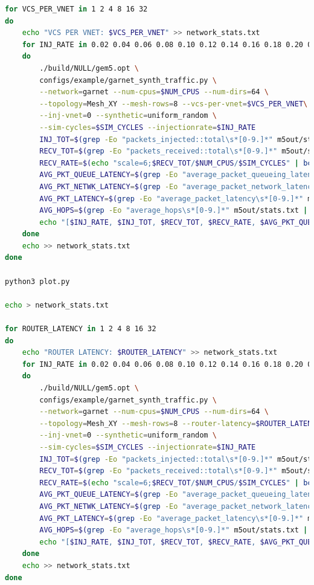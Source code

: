 \documentclass{article}
\begin{document}
\begin{lstlisting}[language=bash]
for VCS_PER_VNET in 1 2 4 8 16 32
do
	echo "VCS PER VNET: $VCS_PER_VNET" >> network_stats.txt
	for INJ_RATE in 0.02 0.04 0.06 0.08 0.10 0.12 0.14 0.16 0.18 0.20 0.22 0.24 0.26 0.28 0.30 0.32 0.34 0.36 0.38 0.40 0.42 0.44 0.46 0.48 0.50 0.52 0.54 0.56 0.58 0.60 0.62 0.64 0.66 0.68 0.70 0.72 0.74 0.76 0.78 0.80
	do
		./build/NULL/gem5.opt \
		configs/example/garnet_synth_traffic.py \
		--network=garnet --num-cpus=$NUM_CPUS --num-dirs=64 \
		--topology=Mesh_XY --mesh-rows=8 --vcs-per-vnet=$VCS_PER_VNET\
		--inj-vnet=0 --synthetic=uniform_random \
		--sim-cycles=$SIM_CYCLES --injectionrate=$INJ_RATE
		INJ_TOT=$(grep -Eo "packets_injected::total\s*[0-9.]*" m5out/stats.txt | grep -Eo "[0-9.]*")
		RECV_TOT=$(grep -Eo "packets_received::total\s*[0-9.]*" m5out/stats.txt | grep -Eo "[0-9.]*")
		RECV_RATE=$(echo "scale=6;$RECV_TOT/$NUM_CPUS/$SIM_CYCLES" | bc)
		AVG_PKT_QUEUE_LATENCY=$(grep -Eo "average_packet_queueing_latency\s*[0-9.]*" m5out/stats.txt | grep -Eo "[0-9.]*")
		AVG_PKT_NETWK_LATENCY=$(grep -Eo "average_packet_network_latency\s*[0-9.]*" m5out/stats.txt | grep -Eo "[0-9.]*")
		AVG_PKT_LATENCY=$(grep -Eo "average_packet_latency\s*[0-9.]*" m5out/stats.txt | grep -Eo "[0-9.]*")
		AVG_HOPS=$(grep -Eo "average_hops\s*[0-9.]*" m5out/stats.txt | grep -Eo "[0-9.]*")
		echo "[$INJ_RATE, $INJ_TOT, $RECV_TOT, $RECV_RATE, $AVG_PKT_QUEUE_LATENCY, $AVG_PKT_NETWK_LATENCY, $AVG_PKT_LATENCY, $AVG_HOPS]" >> network_stats.txt
	done
	echo >> network_stats.txt
done

python3 plot.py

echo > network_stats.txt

for ROUTER_LATENCY in 1 2 4 8 16 32
do
	echo "ROUTER LATENCY: $ROUTER_LATENCY" >> network_stats.txt
	for INJ_RATE in 0.02 0.04 0.06 0.08 0.10 0.12 0.14 0.16 0.18 0.20 0.22 0.24 0.26 0.28 0.30 0.32 0.34 0.36 0.38 0.40 0.42 0.44 0.46 0.48 0.50 0.52 0.54 0.56 0.58 0.60 0.62 0.64 0.66 0.68 0.70 0.72 0.74 0.76 0.78 0.80
	do
		./build/NULL/gem5.opt \
		configs/example/garnet_synth_traffic.py \
		--network=garnet --num-cpus=$NUM_CPUS --num-dirs=64 \
		--topology=Mesh_XY --mesh-rows=8 --router-latency=$ROUTER_LATENCY\
		--inj-vnet=0 --synthetic=uniform_random \
		--sim-cycles=$SIM_CYCLES --injectionrate=$INJ_RATE
		INJ_TOT=$(grep -Eo "packets_injected::total\s*[0-9.]*" m5out/stats.txt | grep -Eo "[0-9.]*")
		RECV_TOT=$(grep -Eo "packets_received::total\s*[0-9.]*" m5out/stats.txt | grep -Eo "[0-9.]*")
		RECV_RATE=$(echo "scale=6;$RECV_TOT/$NUM_CPUS/$SIM_CYCLES" | bc)
		AVG_PKT_QUEUE_LATENCY=$(grep -Eo "average_packet_queueing_latency\s*[0-9.]*" m5out/stats.txt | grep -Eo "[0-9.]*")
		AVG_PKT_NETWK_LATENCY=$(grep -Eo "average_packet_network_latency\s*[0-9.]*" m5out/stats.txt | grep -Eo "[0-9.]*")
		AVG_PKT_LATENCY=$(grep -Eo "average_packet_latency\s*[0-9.]*" m5out/stats.txt | grep -Eo "[0-9.]*")
		AVG_HOPS=$(grep -Eo "average_hops\s*[0-9.]*" m5out/stats.txt | grep -Eo "[0-9.]*")
		echo "[$INJ_RATE, $INJ_TOT, $RECV_TOT, $RECV_RATE, $AVG_PKT_QUEUE_LATENCY, $AVG_PKT_NETWK_LATENCY, $AVG_PKT_LATENCY, $AVG_HOPS]" >> network_stats.txt
	done
	echo >> network_stats.txt
done


\end{lstlisting}
\end{document}
